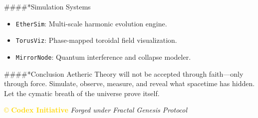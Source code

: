 ####*{Simulation Systems}
\begin{itemize}
    \item \texttt{EtherSim}: Multi-scale harmonic evolution engine.
    \item \texttt{TorusViz}: Phase-mapped toroidal field visualization.
    \item \texttt{MirrorNode}: Quantum interference and collapse modeler.
\end{itemize}

####*{Conclusion}
Aetheric Theory will not be accepted through faith—only through force. Simulate, observe, measure, and reveal what spacetime has hidden. Let the cymatic breath of the universe prove itself.

\vspace{0.5cm}
\noindent
\textcolor{gold}{\copyright{} \textbf{Codex Initiative}} \hfill \textit{Forged under Fractal Genesis Protocol}